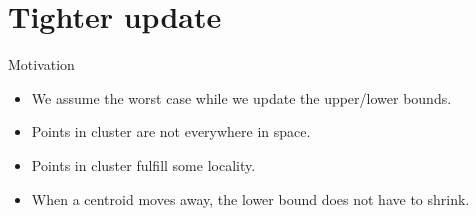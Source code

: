 \documentclass[10pt, compress]{beamer}
\newcommand{\x}{\vec{x}}
\newcommand{\lx}{l(\x)}
\newcommand{\ux}{u(\x)}
\newcommand{\lux}{lu(\x)}
\begin{document}



\section{Tighter update}

\begin{frame}{Motivation}
  \begin{itemize}
    \item We assume the worst case while we update the upper/lower bounds.
    \item Points in cluster are not everywhere in space.
    \item Points in cluster fulfill some locality.
    \item When a centroid moves away, the lower bound does not have to shrink.
  \end{itemize}
  \begin{center}
    
  \end{center}
\end{frame}
\end{document}
